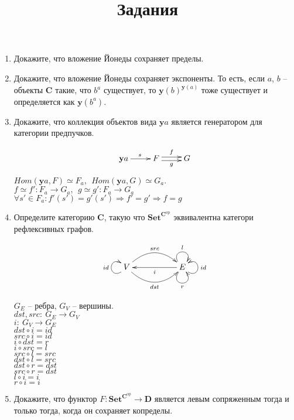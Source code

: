 \documentclass[draft]{article}
\newcommand{\cat}[1]{\mathbf{#1}}
\renewcommand{\C}{\cat{C}}
\newcommand{\D}{\cat{D}}
\newcommand{\y}{\cat{y}}
\newcommand{\Set}{\cat{Set}}
\newcommand{\fs}[1]{\mathrm{#1}}
\newcommand{\op}{\fs{op}}
\begin{document}
\title{Задания}
\maketitle

\begin{enumerate}

\item Докажите, что вложение Йонеды сохраняет пределы.

\item Докажите, что вложение Йонеды сохраняет экспоненты. То есть, если $a$, $b$ -- объекты $\C$ такие, что $b^a$ существует,
то $\y(b)^{\y(a)}$ тоже существует и определяется как $\y(b^a)$.

\item Докажите, что коллекция объектов вида $\y a$ является генератором для категории предпучков.

\[\xymatrix{ \y a \ar[r]^{s} & F \ar@<+0.5ex>[r]^{f} \ar@<-0.5ex>[r]_{g}  & G } \]
$Hom(\y a, F) \simeq F_a,~~Hom(\y a, G) \simeq G_a$.\\
$f \simeq f': F_a \to G_a, ~~g \simeq g': F_a \to G_a$\\
$\forall s' \in F_a: f'(s') = g'(s') \Rightarrow f' = g' \Rightarrow f = g$

\item Определите категорию $\C$, такую что $\Set^{\C^\op}$ эквивалентна категори рефлексивных графов.

\[
\xymatrix{
	V 
	\ar@(ld,lu)^{id}
	\ar@/^1.5pc/[rr]^{src}
	\ar@/_1.5pc/[rr]_{dst}
	&& 
	E 
	\ar@(rd,ru)_{id}	
	\ar@(ul,ur)^{l}	
	\ar@(dl,dr)_{r}	
	\ar[ll]^{i}
}
\]

$G_E$ -- ребра, $G_V$ -- вершины.\\
$dst, src: ~G_E \to G_V$ \\
$i: ~G_V \to G_E$\\
$dst \circ i = id$\\
$src \circ i = id$\\
$i \circ dst = r$\\
$i \circ src = l$\\
$src \circ l = src$\\
$dst \circ l = src$\\
$dst \circ r = dst$\\
$src \circ r = dst$\\
$l \circ i = i$\\
$r \circ i = i$


\item Докажите, что функтор $F : \Set^{\C^\op} \to \D$ является левым сопряженным тогда и только тогда, когда он сохраняет копределы.


\end{enumerate}
\end{document}
